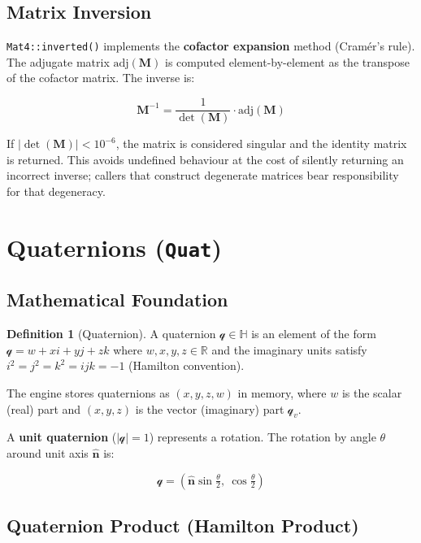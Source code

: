 \documentclass[12pt, a4paper]{report}
\theoremstyle{definition}
\newtheorem{definition}{Definition}[section]
\theoremstyle{remark}
\begin{document}
\subsection{Matrix Inversion}

\texttt{Mat4::inverted()} implements the \textbf{cofactor expansion} method
(Cramér's rule). The adjugate matrix $\text{adj}(\mathbf{M})$ is computed
element-by-element as the transpose of the cofactor matrix. The inverse is:

\[
\mathbf{M}^{-1} = \frac{1}{\det(\mathbf{M})} \cdot \text{adj}(\mathbf{M})
\]

If $|\det(\mathbf{M})| < 10^{-6}$, the matrix is considered singular and
the identity matrix is returned. This avoids undefined behaviour at the
cost of silently returning an incorrect inverse; callers that construct
degenerate matrices bear responsibility for that degeneracy.

\section{Quaternions (\texttt{Quat})}

\subsection{Mathematical Foundation}

\begin{definition}[Quaternion]
A quaternion $\mathcal{q} \in \mathbb{H}$ is an element of the form
$\mathcal{q} = w + xi + yj + zk$ where $w, x, y, z \in \mathbb{R}$ and
the imaginary units satisfy $i^2 = j^2 = k^2 = ijk = -1$ (Hamilton convention).
\end{definition}

The engine stores quaternions as $(x, y, z, w)$ in memory, where $w$ is
the scalar (real) part and $(x, y, z)$ is the vector (imaginary) part
$\mathcal{q}_v$.

A \textbf{unit quaternion} ($|\mathcal{q}| = 1$) represents a rotation.
The rotation by angle $\theta$ around unit axis $\hat{\mathbf{n}}$ is:

\begin{equation}
\mathcal{q} = \left(\hat{\mathbf{n}} \sin\tfrac{\theta}{2},\ \cos\tfrac{\theta}{2}\right)
\label{eq:quat-axis-angle}
\end{equation}

\subsection{Quaternion Product (Hamilton Product)}
\end{document}
